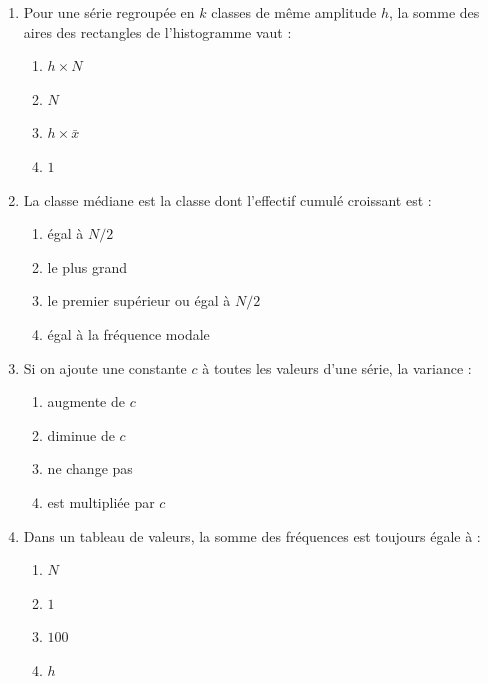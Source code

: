 \documentclass[11pt]{article}
\begin{document}
\begin{exercice}
\begin{enumerate}
    \item Pour une série regroupée en $k$ classes de même amplitude $h$, la somme des aires des rectangles de l'histogramme vaut :
    \begin{enumerate}
        \item $h \times N$ \item $N$ \item $h \times \bar{x}$ \item $1$
    \end{enumerate}
    \item La classe médiane est la classe dont l'effectif cumulé croissant est :
    \begin{enumerate}
        \item égal à $N/2$ \item le plus grand \item le premier supérieur ou égal à $N/2$ \item égal à la fréquence modale
    \end{enumerate}
    \item Si on ajoute une constante $c$ à toutes les valeurs d'une série, la variance :
    \begin{enumerate}
        \item augmente de $c$ \item diminue de $c$ \item ne change pas \item est multipliée par $c$
    \end{enumerate}
    \item Dans un tableau de valeurs, la somme des fréquences est toujours égale à :
    \begin{enumerate}
        \item $N$ \item $1$ \item $100$ \item $h$
    \end{enumerate}
\end{enumerate}
\end{exercice}
\end{document}
